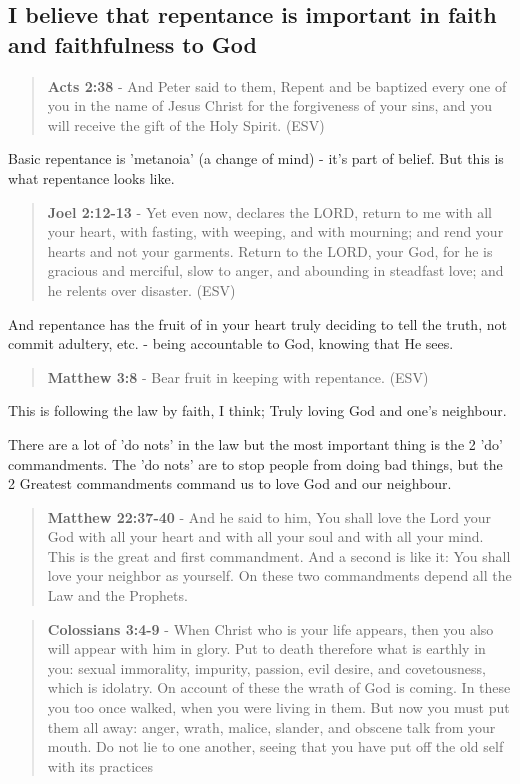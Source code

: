 \documentclass[11pt]{article}
\begin{document}
\subsection{I believe that repentance is important in faith and faithfulness to God}
\label{sec:org5df8fd1}
\begin{quote}
\textbf{Acts 2:38} - And Peter said to them, Repent and be baptized every one of you in the name of Jesus Christ for the forgiveness of your sins, and you will receive the gift of the Holy Spirit. (ESV)
\end{quote}

Basic repentance is 'metanoia' (a change of mind) - it's part of belief.
But this is what repentance looks like.

\begin{quote}
\textbf{Joel 2:12-13} - Yet even now, declares the LORD, return to me with all your heart, with fasting, with weeping, and with mourning; and rend your hearts and not your garments. Return to the LORD, your God, for he is gracious and merciful, slow to anger, and abounding in steadfast love; and he relents over disaster. (ESV)
\end{quote}

And repentance has the fruit of in your heart truly deciding to tell the truth, not commit adultery, etc. - being accountable to God, knowing that He sees.

\begin{quote}
\textbf{Matthew 3:8} - Bear fruit in keeping with repentance. (ESV)
\end{quote}

This is following the law by faith, I think; Truly loving God and one's neighbour.

There are a lot of 'do nots' in the law but the most important thing is the 2 'do' commandments.
The 'do nots' are to stop people from doing bad things, but the 2 Greatest commandments command us to love God and our neighbour.

\begin{quote}
\textbf{Matthew 22:37-40} - And he said to him, You shall love the Lord your God with all your heart and with all your soul and with all your mind. This is the great and first commandment. And a second is like it: You shall love your neighbor as yourself. On these two commandments depend all the Law and the Prophets.
\end{quote}

\begin{quote}
\textbf{Colossians 3:4-9} - When Christ who is your life appears, then you also will appear with him in glory. Put to death therefore what is earthly in you: sexual immorality, impurity, passion, evil desire, and covetousness, which is idolatry. On account of these the wrath of God is coming. In these you too once walked, when you were living in them. But now you must put them all away: anger, wrath, malice, slander, and obscene talk from your mouth. Do not lie to one another, seeing that you have put off the old self with its practices
\end{quote}
\end{document}
